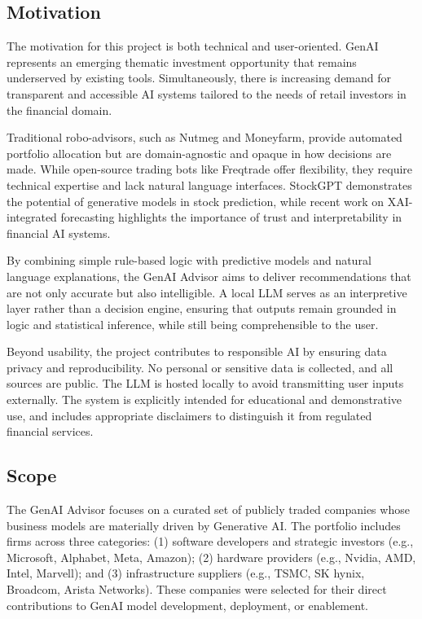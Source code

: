 \subsection{Motivation}

The motivation for this project is both technical and user-oriented. GenAI represents an emerging thematic investment opportunity that remains underserved by existing tools. Simultaneously, there is increasing demand for transparent and accessible AI systems tailored to the needs of retail investors in the financial domain.

Traditional robo-advisors, such as Nutmeg and Moneyfarm, provide automated portfolio allocation but are domain-agnostic and opaque in how decisions are made. While open-source trading bots like Freqtrade offer flexibility, they require technical expertise and lack natural language interfaces. StockGPT \citep{mai2024stockgpt} demonstrates the potential of generative models in stock prediction, while recent work on XAI-integrated forecasting \citep{marey2024xai} highlights the importance of trust and interpretability in financial AI systems.

By combining simple rule-based logic with predictive models and natural language explanations, the GenAI Advisor aims to deliver recommendations that are not only accurate but also intelligible. A local LLM serves as an interpretive layer rather than a decision engine, ensuring that outputs remain grounded in logic and statistical inference, while still being comprehensible to the user.

Beyond usability, the project contributes to responsible AI by ensuring data privacy and reproducibility. No personal or sensitive data is collected, and all sources are public. The LLM is hosted locally to avoid transmitting user inputs externally. The system is explicitly intended for educational and demonstrative use, and includes appropriate disclaimers to distinguish it from regulated financial services.

\subsection{Scope}
\label{sec:scope}

The GenAI Advisor focuses on a curated set of publicly traded companies whose business models are materially driven by Generative AI. The portfolio includes firms across three categories: (1) software developers and strategic investors (e.g., Microsoft, Alphabet, Meta, Amazon); (2) hardware providers (e.g., Nvidia, AMD, Intel, Marvell); and (3) infrastructure suppliers (e.g., TSMC, SK hynix, Broadcom, Arista Networks). These companies were selected for their direct contributions to GenAI model development, deployment, or enablement.

